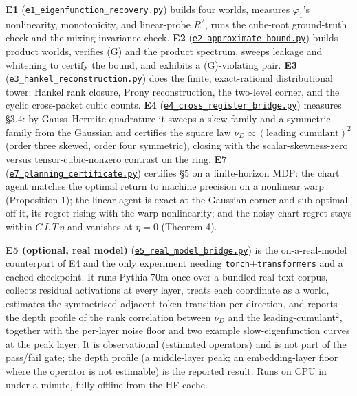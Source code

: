 \documentclass[
  letterpaper,
  11pt]{article}
\theoremstyle{plain}
\theoremstyle{definition}
\theoremstyle{remark}
\begin{document}
\textbf{E1} (\href{https://github.com/leomurillo/AI-ConductorBlindSpot/blob/main/empirical/apex_recovery/e1_eigenfunction_recovery.py}{\texttt{e1\_eigenfunction\_recovery.py}}) builds four worlds, measures \(\varphi_1\)'s nonlinearity, monotonicity, and linear-probe \(R^2\), runs the cube-root ground-truth check and the mixing-invariance check. \textbf{E2} (\href{https://github.com/leomurillo/AI-ConductorBlindSpot/blob/main/empirical/apex_recovery/e2_approximate_bound.py}{\texttt{e2\_approximate\_bound.py}}) builds product worlds, verifies (G) and the product spectrum, sweeps leakage and whitening to certify the bound, and exhibits a (G)-violating pair. \textbf{E3} (\href{https://github.com/leomurillo/AI-ConductorBlindSpot/blob/main/empirical/apex_recovery/e3_hankel_reconstruction.py}{\texttt{e3\_hankel\_reconstruction.py}}) does the finite, exact-rational distributional tower: Hankel rank closure, Prony reconstruction, the two-level corner, and the cyclic cross-packet cubic counts. \textbf{E4} (\href{https://github.com/leomurillo/AI-ConductorBlindSpot/blob/main/empirical/apex_recovery/e4_cross_register_bridge.py}{\texttt{e4\_cross\_register\_bridge.py}}) measures §3.4: by Gauss--Hermite quadrature it sweeps a skew family and a symmetric family from the Gaussian and certifies the square law \(\nu_D \propto (\text{leading cumulant})^2\) (order three skewed, order four symmetric), closing with the scalar-skewness-zero versus tensor-cubic-nonzero contrast on the ring. \textbf{E7} (\href{https://github.com/leomurillo/AI-ConductorBlindSpot/blob/main/empirical/apex_recovery/e7_planning_certificate.py}{\texttt{e7\_planning\_certificate.py}}) certifies §5 on a finite-horizon MDP: the chart agent matches the optimal return to machine precision on a nonlinear warp (Proposition 1); the linear agent is exact at the Gaussian corner and sub-optimal off it, its regret rising with the warp nonlinearity; and the noisy-chart regret stays within \(C\,L\,T\,\eta\) and vanishes at \(\eta=0\) (Theorem 4).

\textbf{E5 (optional, real model)} (\href{https://github.com/leomurillo/AI-ConductorBlindSpot/blob/main/empirical/apex_recovery/e5_real_model_bridge.py}{\texttt{e5\_real\_model\_bridge.py}}) is the on-a-real-model counterpart of E4 and the only experiment needing \texttt{torch}+\texttt{transformers} and a cached checkpoint. It runs Pythia-70m once over a bundled real-text corpus, collects residual activations at every layer, treats each coordinate as a world, estimates the symmetrised adjacent-token transition per direction, and reports the depth profile of the rank correlation between \(\nu_D\) and the leading-cumulant\(^2\), together with the per-layer noise floor and two example slow-eigenfunction curves at the peak layer. It is observational (estimated operators) and is not part of the pass/fail gate; the depth profile (a middle-layer peak; an embedding-layer floor where the operator is not estimable) is the reported result. Runs on CPU in under a minute, fully offline from the HF cache.
\end{document}
